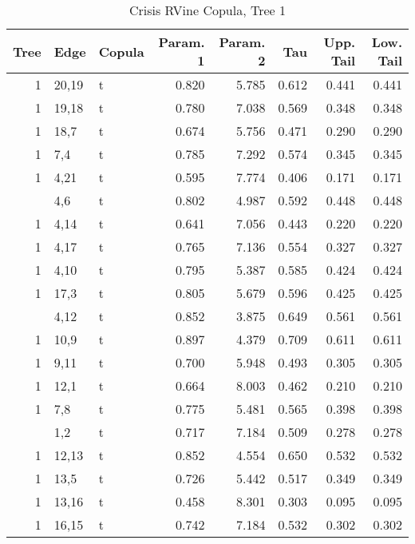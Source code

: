 \begin{table}

\caption{Crisis RVine Copula, Tree 1}
\centering
\begin{tabular}[t]{rllrrrrr}
\toprule
Tree & Edge & Copula & Param. 1 & Param. 2 & Tau & Upp. Tail & Low. Tail\\
\midrule
1 & 20,19 & t & 0.820 & 5.785 & 0.612 & 0.441 & 0.441\\
1 & 19,18 & t & 0.780 & 7.038 & 0.569 & 0.348 & 0.348\\
1 & 18,7 & t & 0.674 & 5.756 & 0.471 & 0.290 & 0.290\\
1 & 7,4 & t & 0.785 & 7.292 & 0.574 & 0.345 & 0.345\\
1 & 4,21 & t & 0.595 & 7.774 & 0.406 & 0.171 & 0.171\\
\addlinespace
1 & 4,6 & t & 0.802 & 4.987 & 0.592 & 0.448 & 0.448\\
1 & 4,14 & t & 0.641 & 7.056 & 0.443 & 0.220 & 0.220\\
1 & 4,17 & t & 0.765 & 7.136 & 0.554 & 0.327 & 0.327\\
1 & 4,10 & t & 0.795 & 5.387 & 0.585 & 0.424 & 0.424\\
1 & 17,3 & t & 0.805 & 5.679 & 0.596 & 0.425 & 0.425\\
\addlinespace
1 & 4,12 & t & 0.852 & 3.875 & 0.649 & 0.561 & 0.561\\
1 & 10,9 & t & 0.897 & 4.379 & 0.709 & 0.611 & 0.611\\
1 & 9,11 & t & 0.700 & 5.948 & 0.493 & 0.305 & 0.305\\
1 & 12,1 & t & 0.664 & 8.003 & 0.462 & 0.210 & 0.210\\
1 & 7,8 & t & 0.775 & 5.481 & 0.565 & 0.398 & 0.398\\
\addlinespace
1 & 1,2 & t & 0.717 & 7.184 & 0.509 & 0.278 & 0.278\\
1 & 12,13 & t & 0.852 & 4.554 & 0.650 & 0.532 & 0.532\\
1 & 13,5 & t & 0.726 & 5.442 & 0.517 & 0.349 & 0.349\\
1 & 13,16 & t & 0.458 & 8.301 & 0.303 & 0.095 & 0.095\\
1 & 16,15 & t & 0.742 & 7.184 & 0.532 & 0.302 & 0.302\\
\bottomrule
\end{tabular}
\end{table}
